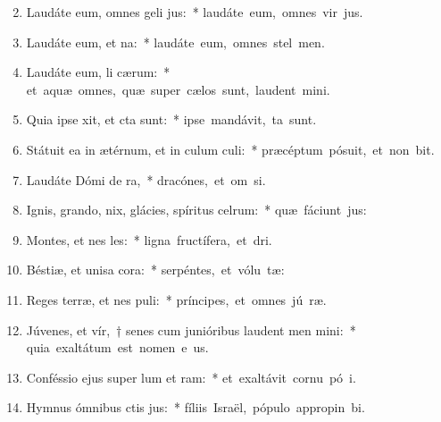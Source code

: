 \begin{flushleft}
\begin{enumerate}[leftmargin=*]
\setcounter{enumi}{1}


\item Laudáte eum, omnes geli jus:~* \mbox{laudáte eum, omnes vir jus.}
\item Laudáte eum,  et na:~* \mbox{laudáte eum, omnes stel  men.}
\item Laudáte eum, li cærum:~* \mbox{et aquæ omnes, quæ super cælos sunt, laudent  mini.}
\item Quia ipse xit, et cta sunt:~* \mbox{ipse mandávit,  ta sunt.}
\item Státuit ea in ætérnum, et in culum culi:~* \mbox{præcéptum pósuit, et non bit.}
\item Laudáte Dómi de ra,~* \mbox{dracónes, et om si.}
\item Ignis, grando, nix, glácies, spíritus celrum:~* \mbox{quæ fáciunt  jus:}
\item Montes, et nes les:~* \mbox{ligna fructífera, et  dri.}
\item Béstiæ, et unisa cora:~* \mbox{serpéntes, et vólu tæ:}
\item Reges terræ, et nes puli:~* \mbox{príncipes, et omnes jú ræ.}
\item Júvenes, et vír,~† senes cum junióribus laudent men mini:~* \mbox{quia exaltátum est nomen e us.}
\item Conféssio ejus super lum et ram:~* \mbox{et exaltávit cornu pó i.}
\item Hymnus ómnibus ctis jus:~* \mbox{fíliis Israël, pópulo appropin bi.}

\end{enumerate}
\end{flushleft}

